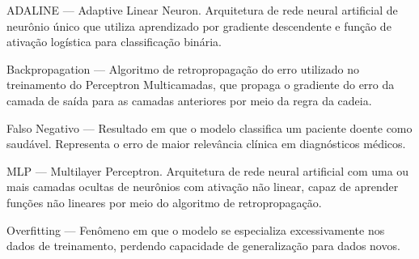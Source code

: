\clearpage
\begin{glossario}

ADALINE --- Adaptive Linear Neuron. Arquitetura de rede neural artificial de neurônio único que utiliza aprendizado por gradiente descendente e função de ativação logística para classificação binária.

Backpropagation --- Algoritmo de retropropagação do erro utilizado no treinamento do Perceptron Multicamadas, que propaga o gradiente do erro da camada de saída para as camadas anteriores por meio da regra da cadeia.

Falso Negativo --- Resultado em que o modelo classifica um paciente doente como saudável. Representa o erro de maior relevância clínica em diagnósticos médicos.

MLP --- Multilayer Perceptron. Arquitetura de rede neural artificial com uma ou mais camadas ocultas de neurônios com ativação não linear, capaz de aprender funções não lineares por meio do algoritmo de retropropagação.

Overfitting --- Fenômeno em que o modelo se especializa excessivamente nos dados de treinamento, perdendo capacidade de generalização para dados novos.

\end{glossario}